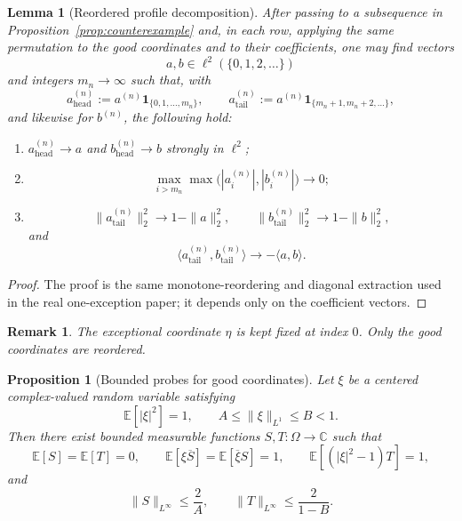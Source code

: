 \documentclass[11pt]{amsart}
\newtheorem{proposition}[theorem]{Proposition}
\newtheorem{lemma}[theorem]{Lemma}
\newtheorem{remark}[theorem]{Remark}
\newcommand{\E}{\mathbb{E}}
\newcommand{\C}{\mathbb{C}}
\begin{document}
\begin{lemma}[Reordered profile decomposition]
\label{lem:profile}
After passing to a subsequence in Proposition~\ref{prop:counterexample} and, in
each row, applying the same permutation to the good coordinates and to their
coefficients, one may find vectors
\[
  a,b\in \ell^2(\{0,1,2,\dots\})
\]
and integers $m_n\to\infty$ such that, with
\[
  a^{(n)}_{\mathrm{head}}:=a^{(n)}\mathbf 1_{\{0,1,\dots,m_n\}},
  \qquad
  a^{(n)}_{\mathrm{tail}}:=a^{(n)}\mathbf 1_{\{m_n+1,m_n+2,\dots\}},
\]
and likewise for $b^{(n)}$, the following hold:
\begin{enumerate}[label=\rm(\arabic*)]
\item $a^{(n)}_{\mathrm{head}}\to a$ and
  $b^{(n)}_{\mathrm{head}}\to b$ strongly in $\ell^2$;
\item
\[
  \max_{i>m_n}\max\bigl(|a_i^{(n)}|,|b_i^{(n)}|\bigr)\longrightarrow 0;
\]
\item
\[
  \|a^{(n)}_{\mathrm{tail}}\|_2^2\longrightarrow 1-\|a\|_2^2,
  \qquad
  \|b^{(n)}_{\mathrm{tail}}\|_2^2\longrightarrow 1-\|b\|_2^2,
\]
and
\[
  \langle a^{(n)}_{\mathrm{tail}},b^{(n)}_{\mathrm{tail}}\rangle
  \longrightarrow
  -\langle a,b\rangle.
\]
\end{enumerate}
\end{lemma}

\begin{proof}
The proof is the same monotone-reordering and diagonal extraction used in the
real one-exception paper; it depends only on the coefficient vectors.
\end{proof}

\begin{remark}
The exceptional coordinate $\eta$ is kept fixed at index $0$.  Only the good
coordinates are reordered.
\end{remark}

\begin{proposition}[Bounded probes for good coordinates]
\label{prop:bounded-probes}
Let $\xi$ be a centered complex-valued random variable satisfying
\[
  \E[|\xi|^2]=1,
  \qquad
  A\le \|\xi\|_{L^1}\le B<1.
\]
Then there exist bounded measurable functions $S,T:\Omega\to\C$ such that
\[
  \E[S]=\E[T]=0,
  \qquad
  \E[\xi\overline{S}]=\E[\overline{\xi}S]=1,
  \qquad
  \E[(|\xi|^2-1)T]=1,
\]
and
\[
  \|S\|_{L^\infty}\le \frac{2}{A},
  \qquad
  \|T\|_{L^\infty}\le \frac{2}{1-B}.
\]
\end{proposition}
\end{document}
